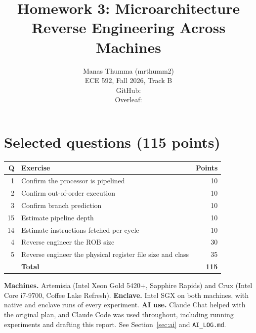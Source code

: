 \documentclass[10pt]{article}
\title{\vspace{-2em}Homework 3: Microarchitecture Reverse Engineering Across Machines}
\author{Manas Thumma (mrthumm2)\\ECE 592, Fall 2026, Track B\\[0.4em]
\small GitHub: \githublink\\\small Overleaf: \overleaflink}
\date{}
\newcommand{\code}[1]{\texttt{#1}}
\begin{document}
\maketitle
\vspace{-3em}

\section*{Selected questions (115 points)}
\begin{center}
\begin{tabular}{rlr}
\toprule
Q & Exercise & Points\\
\midrule
1 & Confirm the processor is pipelined & 10\\
2 & Confirm out-of-order execution & 10\\
3 & Confirm branch prediction & 10\\
15 & Estimate pipeline depth & 10\\
14 & Estimate instructions fetched per cycle & 10\\
4 & Reverse engineer the ROB size & 30\\
5 & Reverse engineer the physical register file size and class & 35\\
\midrule
 & \textbf{Total} & \textbf{115}\\
\bottomrule
\end{tabular}
\end{center}

\textbf{Machines.} Artemisia (Intel Xeon Gold 5420+, Sapphire Rapids) and Crux (Intel Core i7-9700,
Coffee Lake Refresh).
\textbf{Enclave.} Intel SGX on both machines, with native and enclave runs of every experiment.
\textbf{AI use.} Claude Chat helped with the original plan, and Claude Code was used throughout, including running experiments and drafting this report.
See Section~\ref{sec:ai} and \code{AI\_LOG.md}.
\end{document}
